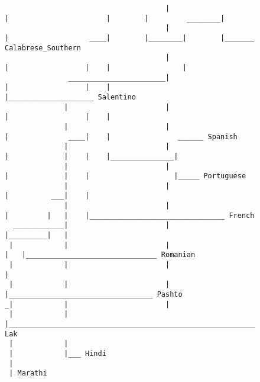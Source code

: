 \begin{figure}[H]
\begin{center}
{\begin{verbatim}
                                      |                    |                       |        |         ________|
                                      |                    |                   ____|        |________|        |_______ Calabrese_Southern
                                      |                    |                  |    |                 |
               _______________________|                    |                  |    |                 |____________________ Salentino
              |                       |                    |                  |    |
              |                       |                    |              ____|    |                ______ Spanish
              |                       |                    |             |    |    |_______________|
              |                       |                    |             |    |                    |_____ Portuguese
              |                       |                    |          ___|    |
              |                       |                    |         |   |    |________________________________ French
  ____________|                       |                    |_________|   |
 |            |                       |                              |   |_______________________________ Romanian
 |            |                       |                              |
 |            |                       |                              |__________________________________ Pashto
_|            |                       |
 |            |                       |______________________________________________________________ Lak
 |            |
 |            |___ Hindi
 |
 | Marathi



\end{verbatim}
}
\label{...}
\end{center}
\end{figure}
